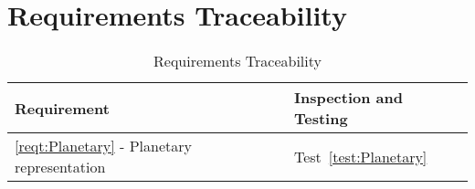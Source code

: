 \section{Requirements Traceability}

\begin{longtable}[c]{||p{3.5in}|p{3.5in}|}
\caption{Requirements Traceability} \\[6pt]
\hline
{\bf Requirement} & {\bf Inspection and Testing} \\ 
\hline \hline
\endhead
\ref{reqt:Planetary} - Planetary representation &
  Test~\ref{test:Planetary} \\ \hline


\end{longtable}
